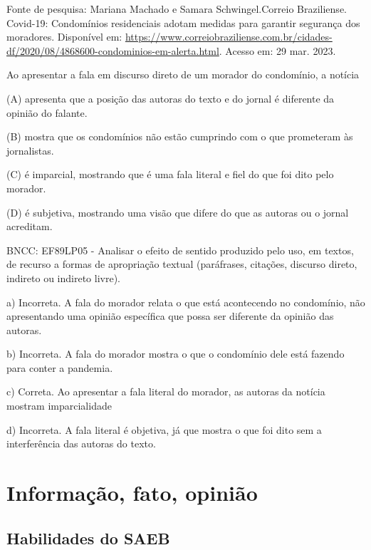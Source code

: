 \begin{itemize}
Fonte de pesquisa: Mariana Machado e Samara Schwingel.Correio
Braziliense. Covid-19: Condomínios residenciais adotam medidas para
garantir segurança dos moradores. Disponível em:
\url{https://www.correiobraziliense.com.br/cidades-df/2020/08/4868600-condominios-em-alerta.html}.
Acesso em: 29 mar. 2023.

Ao apresentar a fala em discurso direto de um morador do condomínio, a
notícia

(A) apresenta que a posição das autoras do texto e do jornal é diferente
da opinião do falante.

(B) mostra que os condomínios não estão cumprindo com o que prometeram
às jornalistas.

(C) é imparcial, mostrando que é uma fala literal e fiel do que foi dito
pelo morador.

(D) é subjetiva, mostrando uma visão que difere do que as autoras ou o
jornal acreditam.

BNCC: EF89LP05 - Analisar o efeito de sentido produzido pelo uso, em
textos, de recurso a formas de apropriação textual (paráfrases,
citações, discurso direto, indireto ou indireto livre).

a) Incorreta. A fala do morador relata o que está acontecendo no
condomínio, não apresentando uma opinião específica que possa ser
diferente da opinião das autoras.

b) Incorreta. A fala do morador mostra o que o condomínio dele está
fazendo para conter a pandemia.

c) Correta. Ao apresentar a fala literal do morador, as autoras da
notícia mostram imparcialidade

d) Incorreta. A fala literal é objetiva, já que mostra o que foi dito
sem a interferência das autoras do texto.

\chapter{Informação, fato, opinião}

\section{Habilidades do SAEB}

\end{itemize}

